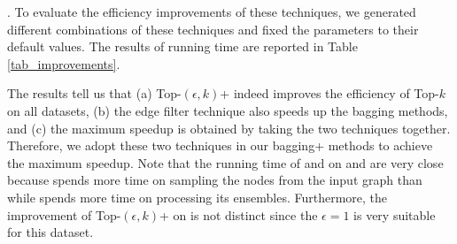 . To evaluate the
efficiency improvements of these techniques, we generated different combinations
of these techniques and fixed the parameters to their default values.
The results of running time are reported in Table \ref{tab_improvements}.

The results tell us that (a) Top-$(\epsilon, k)$+ indeed improves
the efficiency of Top-$k$ on all datasets,
(b) the edge filter technique also speeds up the bagging methods,
and (c) the maximum speedup is obtained by taking the
two techniques together. Therefore, we adopt these two techniques
in our bagging+ methods to achieve the maximum speedup.
Note that the running time of \Biasedp and \Nodep on \YouTube and \Wikipedia
are very close because \Biasedp spends more time on sampling the nodes
from the input graph than \Nodep while \Nodep spends more time on processing
its ensembles. Furthermore, the improvement of Top-$(\epsilon, k)$+ on \Wikipedia is not
distinct since the $\epsilon = 1$ is very suitable for this dataset.

